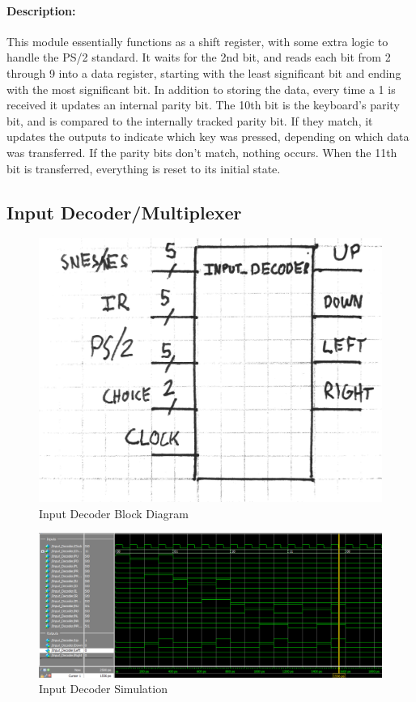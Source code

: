 \documentclass[]{article}
\begin{document}
\paragraph{Description:} This module essentially functions as a shift register, with some extra logic to handle the PS/2 standard.
It waits for the 2nd bit, and reads each bit from 2 through 9 into a data register, starting with the least significant bit and ending with the most significant bit.
In addition to storing the data, every time a 1 is received it updates an internal parity bit.
The 10th bit is the keyboard's parity bit, and is compared to the internally tracked parity bit.
If they match, it updates the outputs to indicate which key was pressed, depending on which data was transferred.
If the parity bits don't match, nothing occurs.
When the 11th bit is transferred, everything is reset to its initial state.

\subsection{Input Decoder/Multiplexer}
\begin{figure}[H]\centering
    \includegraphics[width=0.5\linewidth]{figures/Input_Decoder_Block.jpg}
    \caption{Input Decoder Block Diagram}
    \label{fig:inputDecoderBlock}
\end{figure}
\begin{figure}[H]\centering
    \includegraphics[width=\linewidth]{figures/Input_Decoder_Sim.png}
    \caption{Input Decoder Simulation}
    \label{fig:inputDecoderSim}
\end{figure}
\end{document}
